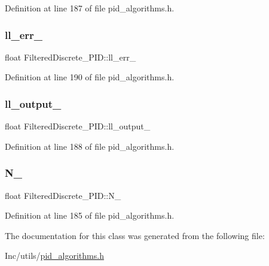 Definition at line 187 of file pid\+\_\+algorithms.\+h.

\mbox{\label{class_filtered_discrete___p_i_d_a3ccaf2b9119f403a65908915340f56e9}} 
\subsubsection{\texorpdfstring{ll\_err\_}{ll\_err\_}}
{\footnotesize\ttfamily float Filtered\+Discrete\+\_\+\+P\+I\+D\+::ll\+\_\+err\+\_\+\hspace{0.3cm}{\ttfamily [private]}}



Definition at line 190 of file pid\+\_\+algorithms.\+h.

\mbox{\label{class_filtered_discrete___p_i_d_a3c18ed8624221fe9c6b343681d6688fe}} 
\subsubsection{\texorpdfstring{ll\_output\_}{ll\_output\_}}
{\footnotesize\ttfamily float Filtered\+Discrete\+\_\+\+P\+I\+D\+::ll\+\_\+output\+\_\+\hspace{0.3cm}{\ttfamily [private]}}



Definition at line 188 of file pid\+\_\+algorithms.\+h.

\mbox{\label{class_filtered_discrete___p_i_d_a491d8d01f3196ce37ccd51b1710925e6}} 
\subsubsection{\texorpdfstring{N\_}{N\_}}
{\footnotesize\ttfamily float Filtered\+Discrete\+\_\+\+P\+I\+D\+::\+N\+\_\+\hspace{0.3cm}{\ttfamily [private]}}



Definition at line 185 of file pid\+\_\+algorithms.\+h.



The documentation for this class was generated from the following file\+:\begin{DoxyCompactItemize}
\item 
Inc/utils/\mbox{\hyperlink{pid__algorithms_8h}{pid\+\_\+algorithms.\+h}}\end{DoxyCompactItemize}
